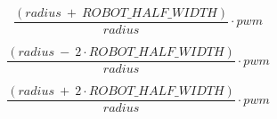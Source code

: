 \documentclass[10pt]{book}
\begin{document}
\begin{mdSnippets}
\begin{mdDisplaySnippet}
\end{mdDisplaySnippet}%
\begin{mdDisplaySnippet}[7e3088bf66eceaede9e261a0e20f7f24]%
\begin{mdDiv}[class={mathdisplay,math-display},color={},math-needpdf={}]%
\[%
\frac{(radius \ + \ ROBOT\_HALF\_WIDTH)} {radius} \cdot pwm
\]%
\end{mdDiv}%

\end{mdDisplaySnippet}%
\begin{mdDisplaySnippet}[5693098578fd89ace3564983fe147102]%
\begin{mdDiv}[class={mathdisplay,math-display},color={},math-needpdf={}]%
\[%
\frac{(radius \ - \ 2 \cdot ROBOT\_HALF\_WIDTH)} {radius} \cdot pwm
\]%
\end{mdDiv}%

\end{mdDisplaySnippet}%
\begin{mdDisplaySnippet}[524327b7ef66984f15e0d023603e4f2c]%
\begin{mdDiv}[class={mathdisplay,math-display},color={},math-needpdf={}]%
\[%
\frac{(radius \ + \ 2 \cdot ROBOT\_HALF\_WIDTH)} {radius} \cdot pwm
\]%
\end{mdDiv}%


\end{mdDisplaySnippet}
\end{mdSnippets}
\end{document}
